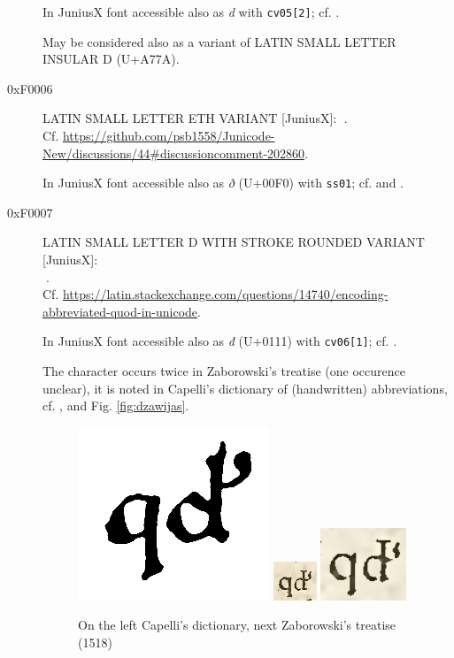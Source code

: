 \documentclass{article}
\newcommand{\Jglyph}[1]{{\relsize{2}\J#1}}
\begin{document}
\begin{description}
  In JuniusX font accessible also as \textit{d} with \texttt{cv05[2]};
  cf. \autocite[p. 7]{baker20:_opent_featur_junius_junius}.

  May be considered also as a variant of LATIN SMALL LETTER INSULAR D (U+A77A).


\item [0xF0006] LATIN SMALL LETTER ETH VARIANT [JuniusX]: 
  \Jglyph{󰀆}.\\ Cf. \url{https://github.com/psb1558/Junicode-New/discussions/44#discussioncomment-202860}.

  In JuniusX font accessible also as \textit{ð} (U+00F0) with
  \texttt{ss01};
  cf. \autocite[p. 11]{baker20:_opent_featur_junius_junius} and
  \autocite[p. 4 (30)]{kenmcd20:_junius_user_guide_first_draft}.

\item [0xF0007] LATIN SMALL LETTER D WITH STROKE ROUNDED VARIANT [JuniusX]:\\
  \Jglyph{󰀇}.\\
  Cf. \url{https://latin.stackexchange.com/questions/14740/encoding-abbreviated-quod-in-unicode}.

    In JuniusX font accessible also as \textit{đ}  (U+0111) with \texttt{cv06[1]};
  cf. \autocite[p. 7]{baker20:_opent_featur_junius_junius}.

  The character occurs twice in Zaborowski's treatise (one occurence
  unclear), it is noted in Capelli's dictionary of (handwritten)
  abbreviations, cf. \autocite{bień20:_trakt_stanis_zabor},
  \autocite[s. 307]{cappelli28:_lexic_wörter_abkür} and
  Fig. \vref{fig:dzawijas}.

  \begin{figure}
    \centering
    \includegraphics[height=06ex]{img/27a-0_Capelli307quod}
    \includegraphics[height=06ex]{img/27a-1_Zaborowski_Polona03_quod}
    \includegraphics[height=06ex]{img/27a-2_Zaborowski_Polona08_quod}
    \caption{On the left Capelli's dictionary, next Zaborowski's treatise (1518)}
    \label{fig:dzawijas}
  \end{figure}


\end{description}
\end{document}
